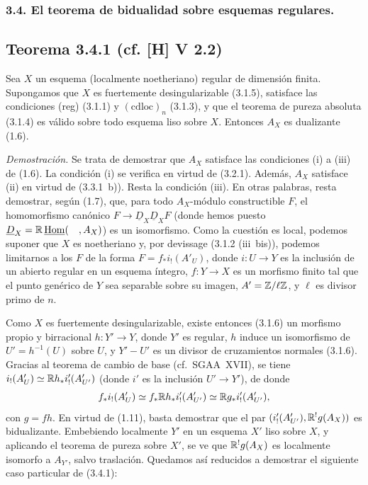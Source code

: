 \subsubsection*{3.4. El teorema de bidualidad sobre esquemas regulares.}

\subsection*{Teorema 3.4.1 (cf. [H] V 2.2)}
Sea $X$ un esquema (localmente noetheriano) regular de dimensión finita. Supongamos que $X$ es fuertemente desingularizable (3.1.5), satisface las condiciones (reg) (3.1.1) y $(\mathrm{cdloc})_n$ (3.1.3), y que el teorema de pureza absoluta (3.1.4) es válido sobre todo esquema liso sobre $X$. Entonces $A_X$ es dualizante (1.6).

\emph{Demostración.} Se trata de demostrar que $A_X$ satisface las condiciones (i) a (iii) de (1.6). La condición (i) se verifica en virtud de (3.2.1). Además, $A_X$ satisface (ii) en virtud de (3.3.1~b)). Resta la condición (iii). En otras palabras, resta demostrar, según (1.7), que, para todo $A_X$-módulo constructible $F$, el homomorfismo canónico $F \to \underline{D}_X \underline{D}_X F$ (donde hemos puesto $\underline{D}_X = \mathbb{R}\,\underline{\operatorname{Hom}}(\quad, A_X)$) es un isomorfismo. Como la cuestión es local, podemos suponer que $X$ es noetheriano y, por devissage (3.1.2 (iii~bis)), podemos limitarnos a los $F$ de la forma $F = f_{*}i_{!}(A'_U)$, donde $i : U \to Y$ es la inclusión de un abierto regular en un esquema íntegro, $f : Y \to X$ es un morfismo finito tal que el punto genérico de $Y$ sea separable sobre su imagen, $A' = \mathbb{Z}/\ell\mathbb{Z}$, y $\ell$ es divisor primo de $n$.

Como $X$ es fuertemente desingularizable, existe entonces (3.1.6) un morfismo propio y birracional $h : Y' \to Y$, donde $Y'$ es regular, $h$ induce un isomorfismo de $U' = h^{-1}(U)$ sobre $U$, y $Y' - U'$ es un divisor de cruzamientos normales (3.1.6). Gracias al teorema de cambio de base (cf.~SGAA~XVII), se tiene $i_{!}(A'_U) \simeq \mathbb{R} h_{*} i'_{!}(A'_{U'})$ (donde $i'$ es la inclusión $U' \to Y'$), de donde
\[
f_{*} i_{!}(A'_U) \simeq f_{*} \mathbb{R} h_{*} i'_{!}(A'_{U'}) \simeq \mathbb{R} g_{*} i'_{!}(A'_{U'}),
\]
con $g = fh$. En virtud de (1.11), basta demostrar que el par $(i'_{!}(A'_{U'}), \mathbb{R}^{!}g(A_X))$ es bidualizante. Embebiendo localmente $Y'$ en un esquema $X'$ liso sobre $X$, y aplicando el teorema de pureza sobre $X'$, se ve que $\mathbb{R}^{!}g(A_X)$ es localmente isomorfo a $A_{Y'}$, salvo traslación. Quedamos así reducidos a demostrar el siguiente caso particular de (3.4.1):

